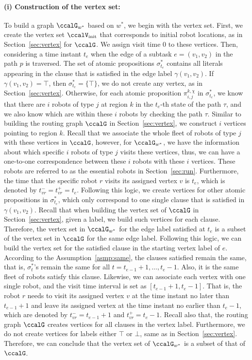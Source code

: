 \documentclass[Afour,sageh,times]{sagej}
\renewcommand{\ap}[3]{\mathcal{\pi}_{{#1},{#2}}^{#3}}
\begin{document}
{{{\paragraph{(i) Construction of the vertex set:} To build a graph $\ccalG_{w^*}$ based on $w^*$, we begin with the vertex set. First, we create the vertex set $\ccalV_{\text{init}}$ that corresponds to initial robot locations, as in Section~\ref{sec:vertex} for $\ccalG$.
We assign visit time 0 to these vertices. Then, considering a time instant $t_e$ when the edge of a subtask  $e = (v_1, v_2)$ in the path $p$ is traversed. The set of atomic propositions $\sigma_{t_e}^*$ contains all literals appearing in the clause that is satisfied in the edge label $\gamma(v_1, v_2)$. If $\gamma(v_1, v_2) = \top$, then $\sigma_{t_e}^* = \{\top\}$, we do not create any vertex, as in Section~\ref{sec:vertex}. Otherwise, for each atomic proposition $\ap{i}{j}{k,\chi}$ in $\sigma_{t_e}^*$, we know that there are $i$ robots of type $j$ at region $k$ in the $t_e$-th state of the path $\tau$, and we also know which are within these $i$ robots by checking the path $\tau$. Similar to building the routing graph $\ccalG$ in Section~\ref{sec:vertex}, we construct $i$ vertices pointing to region $k$. Recall that we associate the whole fleet of robots of type $j$ with these vertices in $\ccalG$, however, for $\ccalG_{w^*}$, we have the information about which specific $i$ robots of type $j$ visits these vertices, thus, we can have a one-to-one correspondence between these $i$ robots with these $i$ vertices. These robots are referred to as the essential robots in Section~\ref{sec:run}. Furthermore, the time that the specific  robot $r$ visits its assigned vertex $v$ is $t_e$, which is denoted by $t_{vr}^- = t_{vr}^+ = t_e$. Following this logic, we create vertices for other atomic propositions in $\sigma_{t_e}^*$, which only correspond to one single clause that is satisfied in $\gamma(v_1, v_2)$. Recall that when building the vertex set of $\ccalG$ in Section~\ref{sec:vertex}, given a label, we build such vertices for each clause. Therefore, the vertex set in $\ccalG_{w^*}$ for the edge label satisfied at $t_e$ is a subset of the vertex set in $\ccalG$ for the same edge label. Following this logic, we can build the vertex set for the satisfied clause in the starting vertex label of $e$. According to the Assumption~\ref{asmp:same}, the clauses satisfied remain the same, that is, $\sigma^*_t$'s remain the same for all $t= t_{e-1}+1, \ldots, t_{e}-1$. Also, it is the same fleet of robots satisfy this clause. Likewise, we can associate each vertex with one single robot, and the visit time interval is set as $[t_{e-1}+1, t_{e}-1]$. That is, the robot $r$ needs to visit its assigned vertex $v$ at the time instant  no later than  $t_{e-1}+1$ and leave its assigned vertex at the time instant no earlier than $t_{e}-1$, which are denoted by $t_{vr}^- = t_{e-1}+1$ and $t_{vr}^+ = t_{e}-1$. Recall also that, the routing graph $\ccalG$ creates vertices for all clauses in the vertex label.  Furthermore, we do not create vertices for labels either $\top$ or $\bot$, same as in Section~\ref{sec:vertex}. Therefore, we can conclude that the vertex set of $\ccalG_{w^*}$ is a subset of that of $\ccalG$.

}}}
\end{document}
